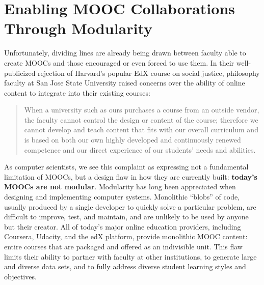 

\def\thetitle{Enabling MOOC Collaborations Through Modularity}
\def\shorttitle{Modular MOOCs}
\def\theauthors{Geoffrey Challen (\textit{University at Buffalo}) and Margo
Seltzer (\textit{Harvard University})}
\def\shortauthors{Challen}
\def\submissiondate{\today}
\def\whitepapername{Learning with MOOCs}


\pagestyle{whitepaper}
\thispagestyle{emptywhitepaper}

\chapter{\thetitle}



Unfortunately, dividing lines are already being drawn
between faculty able to create MOOCs and those encouraged or even forced to
use them. In their well-publicized rejection of Harvard's popular EdX course
on social justice, philosophy faculty at San Jose State University raised
concerns over the ability of online content to integrate into their existing
courses:

\begin{quote}

When a university such as ours purchases a course from an outside vendor, the
faculty cannot control the design or content of the course; therefore we
cannot develop and teach content that fits with our overall curriculum and is
based on both our own highly developed and continuously renewed competence
and our direct experience of our students' needs and abilities.

\end{quote}

As computer scientists, we see this complaint as expressing not a fundamental
limitation of MOOCs, but a design flaw in how they are currently built:
\textbf{today's MOOCs are not modular}. Modularity has long been appreciated
when designing and implementing computer systems. Monolithic ``blobs'' of
code, usually produced by a single developer to quickly solve a particular
problem, are difficult to improve, test, and maintain, and are unlikely to be
used by anyone but their creator. All of today's major online education
providers, including Coursera, Udacity, and the edX platform, provide
monolithic MOOC content: entire courses that are packaged and offered as an
indivisible unit. This flaw limits their ability to partner with faculty at
other institutions, to generate large and diverse data sets, and to fully
address diverse student learning styles and objectives.

